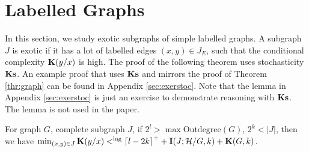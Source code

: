 \documentclass[11pt]{article}\textwidth 6.5in\textheight 9in
\begin{document}
\section{Labelled Graphs}
\label{sec:graph}
In this section, we study exotic subgraphs of simple labelled graphs. A subgraph $J$ is exotic if it has a lot of labelled edges $(x,y)\in J_E$, such that the conditional complexity ${\mathbf K}(y/x)$ is high. The proof of the following theorem uses stochasticity $\mathbf{Ks}$.  
An example proof that uses $\mathbf{Ks}$ and mirrors the proof of Theorem \ref{thr:graph} can be found in Appendix \ref{sec:exerstoc}. Note that the lemma in Appendix \ref{sec:exerstoc} is just an exercise to demonstrate  reasoning with $\mathbf{Ks}$. The lemma is not used in the paper.
\begin{thr}
	\label{thr:graph}
	\noindent For graph $G$, complete subgraph $J$, if $2^l> \max\mathrm{Outdegree}(G)$, $2^k< |J|$, then we have $\min_{(x,y)\in J}{\mathbf K}(y/x)<^{\log} {\lceil l-2k\rceil}^++{\mathbf I}(J;{\mathcal H}/G,k)+{\mathbf K}(G,k)$.
\end{thr}
\end{document}
